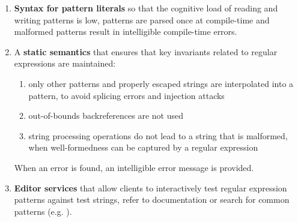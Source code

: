 \begin{enumerate}
\item \textbf{Syntax for pattern literals} so that the cognitive load of reading and writing patterns is low, patterns are parsed once at compile-time and malformed patterns result in intelligible {compile-time} errors.
\item A \textbf{static semantics} that ensures that key invariants related to regular expressions are maintained:
	\begin{enumerate}
	\item only other patterns and properly escaped strings are interpolated into a pattern, to avoid splicing errors and injection attacks \cite{owasp2013, Bravenboer:2007:PIA:1289971.1289975}
	\item out-of-bounds backreferences are not used \cite{spishak2012type}
	\item string processing operations do not lead to a string that is malformed, when well-formedness can be captured by a regular expression \cite{fulton-thesis}
	\end{enumerate}
When an error is found, an intelligible error message is provided.
\item \textbf{Editor services} that allow clients to interactively test regular expression patterns against test strings, refer to documentation or search for common patterns (e.g. \cite{IntelliJRegexp}).
\end{enumerate}

